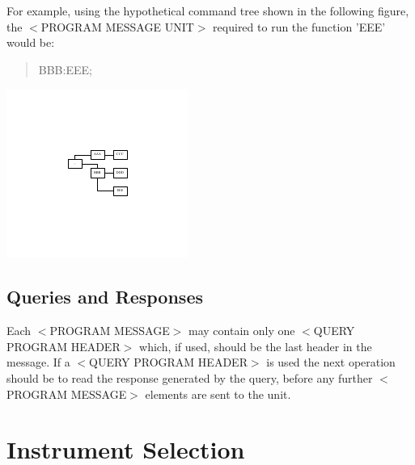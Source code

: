 For example, using the hypothetical command tree shown in the following figure, the {\ttfamily $<$}P\-R\-O\-G\-R\-A\-M M\-E\-S\-S\-A\-G\-E U\-N\-I\-T{\ttfamily $>$} required to run the function 'E\-E\-E' would be\-: \begin{quotation}
{\ttfamily B\-B\-B\-:E\-E\-E;}

\end{quotation}


\begin{center}

\begin{DoxyImageNoCaption}
  \mbox{\includegraphics[width=\textwidth,height=\textheight/2,keepaspectratio=true]{dot_inline_dotgraph_1}}
\end{DoxyImageNoCaption}
\end{center}
\hypertarget{a00002_queries}{}\subsection{Queries and Responses}\label{a00002_queries}
Each {\ttfamily $<$}P\-R\-O\-G\-R\-A\-M M\-E\-S\-S\-A\-G\-E{\ttfamily $>$} may contain only one {\ttfamily $<$}Q\-U\-E\-R\-Y P\-R\-O\-G\-R\-A\-M H\-E\-A\-D\-E\-R{\ttfamily $>$} which, if used, should be the last header in the message. If a {\ttfamily $<$}Q\-U\-E\-R\-Y P\-R\-O\-G\-R\-A\-M H\-E\-A\-D\-E\-R{\ttfamily $>$} is used the next operation should be to read the response generated by the query, before any further {\ttfamily $<$}P\-R\-O\-G\-R\-A\-M M\-E\-S\-S\-A\-G\-E{\ttfamily $>$} elements are sent to the unit.\hypertarget{a00002_device}{}\section{Instrument Selection}\label{a00002_device}
